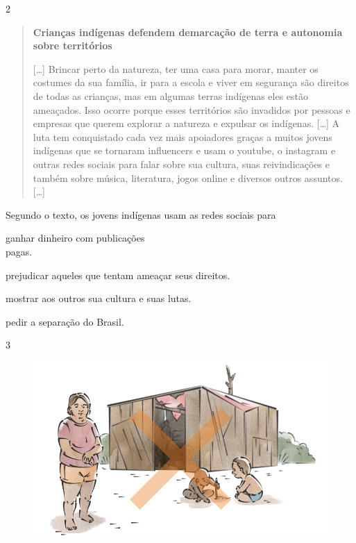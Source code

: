 \num{2}

\begin{quote}
\textbf{Crianças indígenas defendem demarcação de terra e autonomia
sobre territórios}

{[}\ldots{}{]}
Brincar perto da natureza, ter uma casa para morar, manter os costumes
da sua família, ir para a escola e viver em segurança são direitos de
todas as crianças, mas em algumas terras indígenas eles estão ameaçados.
Isso ocorre porque esses territórios são invadidos por pessoas e
empresas que querem explorar a natureza e expulsar os indígenas. {[}\ldots{}{]} 
A luta
tem conquistado cada vez mais apoiadores graças a muitos jovens
indígenas que se tornaram influencers e usam o youtube, o instagram e
outras redes sociais para falar sobre sua cultura, suas reivindicações e
também sobre música, literatura, jogos online e diversos outros
assuntos. {[}\ldots{}{]}

\end{quote}

\pagebreak
Segundo o texto, os jovens indígenas usam as redes sociais para

\begin{minipage}{0.5\textwidth}
\begin{escolha}
\item ganhar dinheiro com publicações\\ pagas.

\item prejudicar aqueles que tentam ameaçar seus direitos.

\item mostrar aos outros sua cultura e suas lutas.

\item pedir a separação do Brasil.
\end{escolha}
\end{minipage}


\num{3}

\begin{figure}[htpb!]
\includegraphics[width=.5\textwidth]{./imgs/img52.jpg}
\end{figure}

